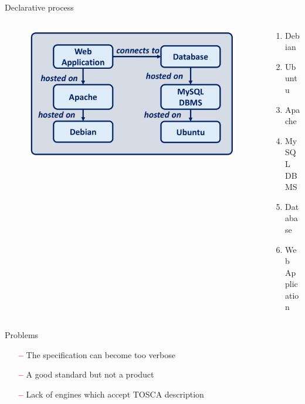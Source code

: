 \documentclass{beamer}
\begin{document}
  \begin{frame}{Declarative process}
    \begin{columns}[c]
      \begin{column}{.65\textwidth}
        \begin{figure}
          \includegraphics[width=\textwidth]{img/tosca_deploy.png}
        \end{figure}
      \end{column}
      \begin{column}{.35\textwidth}
        \begin{enumerate}
          \item<1-> Debian
          \item<1-> Ubuntu
          \item<2-> Apache
          \item<2-> MySQL DBMS
          \item<3-> Database
          \item<4> Web Application
        \end{enumerate}
      \end{column}
    \end{columns}
  \end{frame}

  \begin{frame}{Problems}
    \begin{itemize}
      \item[\textcolor{red}{\textbf{--}}] The specification can become too verbose
      \item[\textcolor{red}{\textbf{--}}] A good standard but not a product
      \item[\textcolor{red}{\textbf{--}}] Lack of engines which accept TOSCA description
    \end{itemize}
  \end{frame}
\end{document}
